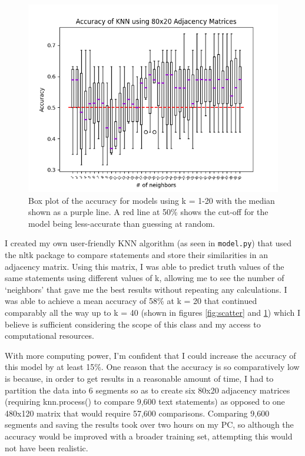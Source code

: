 \documentclass[]{article}
\begin{document}
		\begin{figure}
			\centering
			\includegraphics[width=0.8\linewidth]{accuracies-box.png}
			\caption{Box plot of the accuracy for models using k = 1-20 with the median shown as a purple line. A red line at 50\% shows the cut-off for the model being less-accurate than guessing at random.}
			\label{fig:box}
		\end{figure}
	
		I created my own user-friendly KNN algorithm (as seen in \texttt{model.py}) that used the nltk package to compare statements and store their similarities in an adjacency matrix. Using this matrix, I was able to predict truth values of the same statements using different values of k, allowing me to see the number of `neighbors' that gave me the best results without repeating any calculations.
		I was able to achieve a mean accuracy of 58\% at k = 20 that continued comparably all the way up to k = 40 (shown in figures \ref{fig:scatter} and \ref{fig:box}) which I believe is sufficient considering the scope of this class and my access to computational resources.
		
		
		With more computing power, I'm confident that I could increase the accuracy of this model by at least 15\%. One reason that the accuracy is so comparatively low is because, in order to get results in a reasonable amount of time, I had to partition the data into 6 segments so as to create six 80x20 adjacency matrices (requiring knn.process() to compare 9,600 text statements) as opposed to one 480x120 matrix that would require 57,600 comparisons. Comparing 9,600 segments and saving the results took over two hours on my PC, so although the accuracy would be improved with a broader training set, attempting this would not have been realistic.
		
\end{document}
